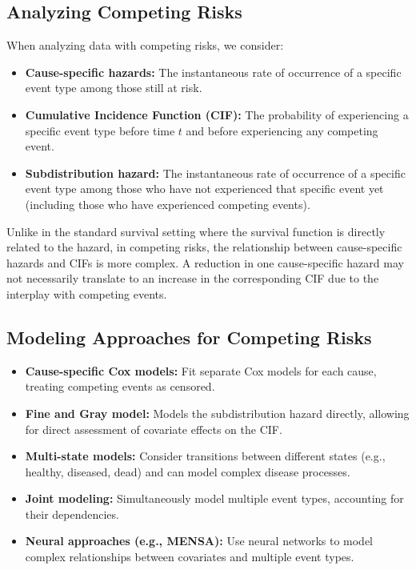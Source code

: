 \subsection{Analyzing Competing Risks}
\label{subsec:analyzing-competing-risks}

When analyzing data with competing risks, we consider:

\begin{itemize}
    \item \textbf{Cause-specific hazards:} The instantaneous rate of occurrence of a specific event type among those still at risk.

    \item \textbf{Cumulative Incidence Function (CIF):} The probability of experiencing a specific event type before time $t$ and before experiencing any competing event.

    \item \textbf{Subdistribution hazard:} The instantaneous rate of occurrence of a specific event type among those who have not experienced that specific event yet (including those who have experienced competing events).
\end{itemize}

Unlike in the standard survival setting where the survival function is directly related to the hazard, in competing risks, the relationship between cause-specific hazards and CIFs is more complex. A reduction in one cause-specific hazard may not necessarily translate to an increase in the corresponding CIF due to the interplay with competing events.

\subsection{Modeling Approaches for Competing Risks}
\label{subsec:modeling-competing-risks}

\begin{itemize}
    \item \textbf{Cause-specific Cox models:} Fit separate Cox models for each cause, treating competing events as censored.

    \item \textbf{Fine and Gray model:} Models the subdistribution hazard directly, allowing for direct assessment of covariate effects on the CIF.

    \item \textbf{Multi-state models:} Consider transitions between different states (e.g., healthy, diseased, dead) and can model complex disease processes.

    \item \textbf{Joint modeling:} Simultaneously model multiple event types, accounting for their dependencies.

    \item \textbf{Neural approaches (e.g., MENSA):} Use neural networks to model complex relationships between covariates and multiple event types.
\end{itemize}

